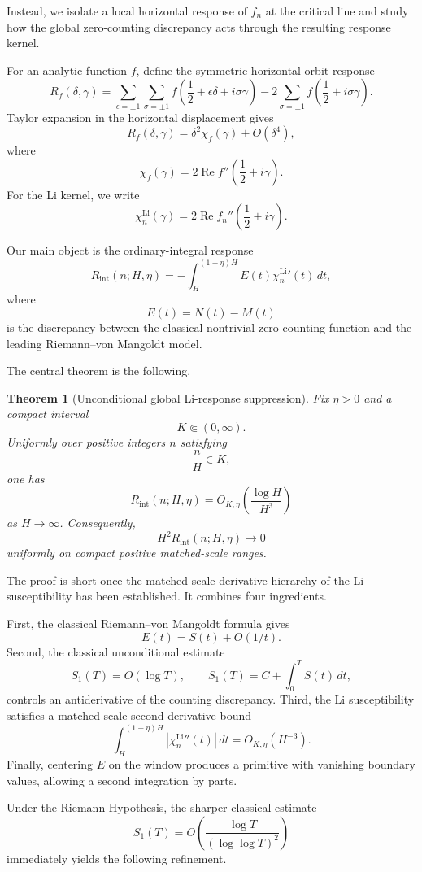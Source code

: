 \documentclass[11pt]{article}
\newtheorem{theorem}{Theorem}[section]
\newcommand{\LiSus}{\chi^{\mathrm{Li}}}
\newcommand{\Rint}{R_{\mathrm{int}}}
\begin{document}
Instead, we isolate a local horizontal response of \(f_n\) at the
critical line and study how the global zero-counting discrepancy acts
through the resulting response kernel.

For an analytic function \(f\), define the symmetric horizontal orbit
response
\[
R_f(\delta,\gamma)
=
\sum_{\epsilon=\pm1}
\sum_{\sigma=\pm1}
f
\left(
\frac12+\epsilon\delta+i\sigma\gamma
\right)
-
2
\sum_{\sigma=\pm1}
f
\left(
\frac12+i\sigma\gamma
\right).
\]
Taylor expansion in the horizontal displacement gives
\[
R_f(\delta,\gamma)
=
\delta^2\chi_f(\gamma)
+
O(\delta^4),
\]
where
\[
\chi_f(\gamma)
=
2\operatorname{Re}
f''
\left(
\frac12+i\gamma
\right).
\]
For the Li kernel, we write
\[
\LiSus_n(\gamma)
=
2\operatorname{Re}
f_n''
\left(
\frac12+i\gamma
\right).
\]

Our main object is the ordinary-integral response
\[
\Rint(n;H,\eta)
=
-
\int_H^{(1+\eta)H}
E(t)\LiSus_n'(t)\,dt,
\]
where
\[
E(t)=N(t)-M(t)
\]
is the discrepancy between the classical nontrivial-zero counting
function and the leading Riemann--von Mangoldt model.

The central theorem is the following.

\begin{theorem}[Unconditional global Li-response suppression]
\label{thm:main}
Fix \(\eta>0\) and a compact interval
\[
K\Subset(0,\infty).
\]
Uniformly over positive integers \(n\) satisfying
\[
\frac nH\in K,
\]
one has
\[
\Rint(n;H,\eta)
=
O_{K,\eta}
\left(
\frac{\log H}{H^3}
\right)
\]
as \(H\to\infty\). Consequently,
\[
H^2\Rint(n;H,\eta)\to0
\]
uniformly on compact positive matched-scale ranges.
\end{theorem}

The proof is short once the matched-scale derivative hierarchy of
the Li susceptibility has been established. It combines four ingredients.

First, the classical Riemann--von Mangoldt formula gives
\[
E(t)=S(t)+O(1/t).
\]
Second, the classical unconditional estimate
\[
S_1(T)=O(\log T),
\qquad
S_1(T)=C+\int_0^T S(t)\,dt,
\]
controls an antiderivative of the counting discrepancy.
Third, the Li susceptibility satisfies a matched-scale second-derivative
bound
\[
\int_H^{(1+\eta)H}
|\LiSus_n''(t)|\,dt
=
O_{K,\eta}(H^{-3}).
\]
Finally, centering \(E\) on the window produces a primitive with
vanishing boundary values, allowing a second integration by parts.

Under the Riemann Hypothesis, the sharper classical estimate
\[
S_1(T)
=
O
\left(
\frac{\log T}
{(\log\log T)^2}
\right)
\]
immediately yields the following refinement.
\end{document}
